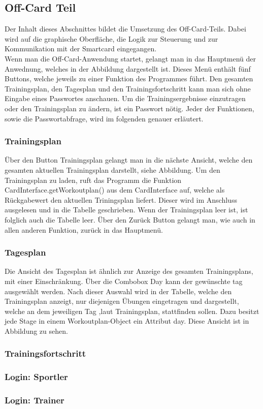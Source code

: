 \subsection{Off-Card Teil}
\label{subsec:3.3}


Der Inhalt dieses Abschnittes bildet die Umsetzung des Off-Card-Teils. Dabei wird auf die graphische Oberfläche, die Logik zur Steuerung und zur Kommunikation mit der Smartcard eingegangen. \\
\newline
Wenn man die Off-Card-Anwendung startet, gelangt man in das Hauptmenü der Anwednung, welches in der Abbildung  dargestellt ist. Dieses Menü enthält fünf Buttons, welche jeweils zu einer Funktion des Programmes führt. Den gesamten Trainingsplan, den Tagesplan und den Trainingsfortschritt kann man sich ohne Eingabe eines Passwortes anschauen. Um die Trainingsergebnisse einzutragen oder den Trainingsplan zu ändern, ist ein Passwort nötig. Jeder der Funktionen, sowie die Passwortabfrage, wird im folgenden genauer erläutert.

\subsubsection*{Trainingsplan}

Über den Button Trainingsplan gelangt man in die nächste Ansicht, welche den gesamten aktuellen Trainingsplan darstellt, siehe Abbildung. Um den Trainingsplan zu laden, ruft das Programm die Funktion CardInterface.getWorkoutplan() aus dem CardInterface auf, welche als Rückgabewert den aktuellen Triningsplan liefert. Dieser wird im Anschluss ausgelesen und in die Tabelle geschrieben. Wenn der Trainingsplan leer ist, ist folglich auch die Tabelle leer. Über den Zurück Button gelangt man, wie auch in allen anderen Funktion, zurück in das Hauptmenü.

\subsubsection*{Tagesplan}

Die Ansicht des Tagesplan ist ähnlich zur Anzeige des gesamten Trainingsplans, mit einer Einschränkung. Über die Combobox Day kann der gewünschte tag ausgewählt werden. Nach dieser Auswahl wird in der Tabelle, welche den Trainingsplan anzeigt, nur diejenigen Übungen eingetragen und dargestellt, welche an dem jeweiligen Tag ,laut Trainingsplan, stattfinden sollen. Dazu besitzt jede Stage in einem Workoutplan-Object ein Attribut day. Diese Ansicht ist in Abbildung zu sehen.

\subsubsection*{Trainingsfortschritt}

\subsubsection*{Login: Sportler}

\subsubsection*{Login: Trainer}